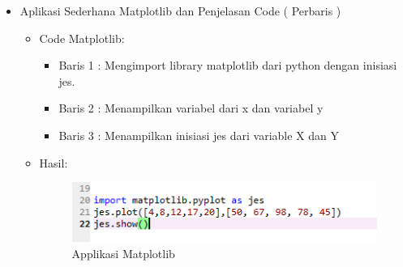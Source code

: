 \begin{enumerate}
\begin{itemize}
\begin{itemize}
\par
\par
\item Aplikasi Sederhana Matplotlib dan Penjelasan Code ( Perbaris )
\begin{itemize}
\item Code Matplotlib:
\par 
\par
\begin{itemize}
\item Baris 1 : Mengimport library matplotlib dari python dengan inisiasi jes.
\par
\item Baris 2 : Menampilkan variabel dari x dan variabel y
\par
\item Baris 3 : Menampilkan inisiasi jes dari variable X dan Y
\par
\end{itemize}
\item Hasil:
\par
\par
\begin{figure}[ht]
\centering
\includegraphics[scale=0.8]{figures/hmm/3.png}
\caption{Applikasi Matplotlib}
\label{contoh}
\end{figure}
\par
\end{itemize}


\end{itemize}
\end{itemize}
\end{enumerate}
